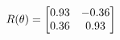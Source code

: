 \documentclass[preview]{standalone}
\begin{document}
\begin{align*}
\special{dvisvgm:raw <g id='unique000'>}R(\theta) = \begin{bmatrix}0.93 & -0.36\\0.36 & 0.93\end{bmatrix}\special{dvisvgm:raw </g>}
\end{align*}
\end{document}
